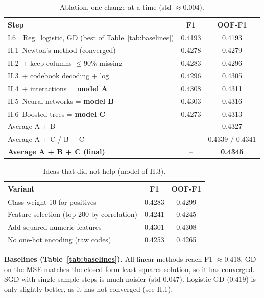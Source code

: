\documentclass[10pt,conference,compsocconf]{IEEEtran}
\begin{document}
\begin{table}[tbp]
\centering
\caption{Ablation, one change at a time (std $\approx$0.004).}
\label{tab:ablation}
\begin{tabular}{lcc}
\toprule
Step & F1 & OOF-F1\\
\midrule
I.6\ \ Reg.\ logistic, GD (best of Table~\ref{tab:baselines}) & 0.4193 & 0.4193\\
II.1\ Newton's method (converged) & 0.4278 & 0.4279\\
II.2\ + keep columns $\le$90\% missing & 0.4283 & 0.4296\\
II.3\ + codebook decoding + log & 0.4296 & 0.4305\\
II.4\ + interactions = \textbf{model A} & 0.4308 & 0.4311\\
\midrule
II.5\ Neural networks = \textbf{model B} & 0.4303 & 0.4316\\
II.6\ Boosted trees = \textbf{model C} & 0.4273 & 0.4313\\
\midrule
Average A + B & -- & 0.4327\\
Average A + C / B + C & -- & 0.4339 / 0.4341\\
\textbf{Average A + B + C (final)} & -- & \textbf{0.4345}\\
\bottomrule
\end{tabular}
\vspace{-2mm}
\end{table}

\begin{table}[tbp]
\centering
\caption{Ideas that did not help (model of II.3).}
\label{tab:other}
\begin{tabular}{lcc}
\toprule
Variant & F1 & OOF-F1\\
\midrule
Class weight 10 for positives & 0.4283 & 0.4299\\
Feature selection (top 200 by correlation) & 0.4241 & 0.4245\\
Add squared numeric features & 0.4301 & 0.4308\\
No one-hot encoding (raw codes) & 0.4253 & 0.4265\\
\bottomrule
\end{tabular}
\vspace{-3mm}
\end{table}

\textbf{Baselines (Table~\ref{tab:baselines}).}
All linear methods reach F1 $\approx$0.418.
GD on the MSE matches the closed-form least-squares solution, so it has converged.
SGD with single-sample steps is much noisier (std 0.047).
Logistic GD (0.419) is only slightly better, as it has not converged (see II.1).
\end{document}
